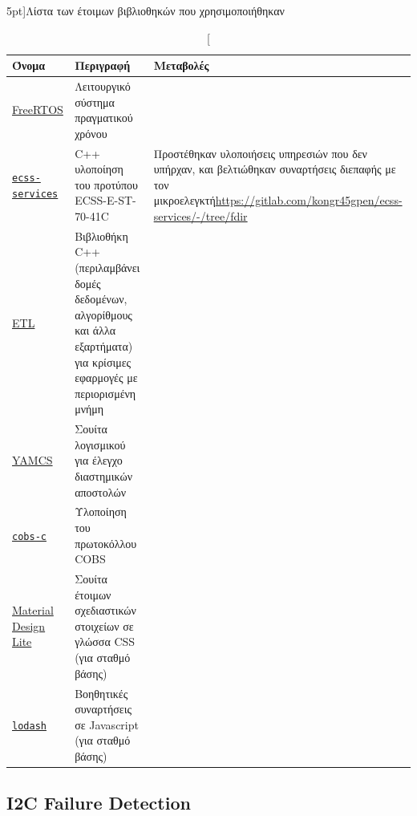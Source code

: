 \documentclass[a4paper,nobib]{tufte-book}
\begin{document}
\begin{table}[h]
	\centering
	\vspace{2em}
	\caption[][5pt]{Λίστα των έτοιμων βιβλιοθηκών που χρησιμοποιήθηκαν}
	\label{tab:old_software}
	\begin{tabularx}{\textwidth}{@{}lp{6cm}X@{}}
		\toprule
		Όνομα & Περιγραφή & Μεταβολές \\ \midrule
		\href{https://www.freertos.org/}{FreeRTOS} & Λειτουργικό σύστημα πραγματικού χρόνου & \\
		\href{https://gitlab.com/acubesat/obc/ecss-services}{\texttt{ecss-services}} & C++ υλοποίηση του προτύπου ECSS-E-ST-70-41C %
		& \small
		Προστέθηκαν υλοποιήσεις υπηρεσιών που δεν υπήρχαν, και βελτιώθηκαν συναρτήσεις διεπαφής με τον μικροελεγκτή\newline\small\url{https://gitlab.com/kongr45gpen/ecss-services/-/tree/fdir}
		 \\
		 \href{https://www.etlcpp.com/}{\acs{ETL}}  & Βιβλιοθήκη C++ (περιλαμβάνει δομές δεδομένων, αλγορίθμους και άλλα εξαρτήματα) για κρίσιμες εφαρμογές με περιορισμένη μνήμη &
		 \\
 		\href{https://github.com/yamcs/yamcs}{\acs{YAMCS}}  & Σουίτα λογισμικού για έλεγχο διαστημικών αποστολών& %
 		\\
		\href{https://github.com/cmcqueen/cobs-c}{\texttt{cobs-c}}  & Υλοποίηση του πρωτοκόλλου \ac{COBS} %
		 & \\
		 \href{https://getmdl.io/}{Material Design Lite}  & Σουίτα έτοιμων σχεδιαστικών στοιχείων σε γλώσσα CSS (για σταθμό βάσης)
		 & \\
		 \href{https://lodash.com/}{\texttt{lodash}}  & Βοηθητικές συναρτήσεις σε Javascript (για σταθμό βάσης)
		 & \\
		\bottomrule
	\end{tabularx}
\end{table}



\subsection{\ac{I2C} Failure Detection}
\label{sec:howcani2cfail}
\end{document}
